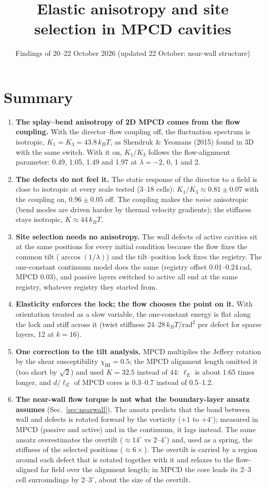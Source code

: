 \documentclass[11pt,a4paper]{article}
\title{Elastic anisotropy and site selection in MPCD cavities}
\author{Findings of 20--22 October 2026 (updated 22 October: near-wall structure)}
\date{}
\newcommand{\kT}{k_BT}\newcommand{\half}{\tfrac12}\newcommand{\la}{\ell_a}
\begin{document}
\maketitle

\section*{Summary}
\begin{enumerate}
\item \textbf{The splay--bend anisotropy of 2D MPCD comes from the flow coupling.} With the director--flow coupling off, the fluctuation spectrum
is isotropic, $K_1=K_3=43.8\,\kT$, as Shendruk \& Yeomans (2015) found in 3D with the same switch. With it on, $K_1/K_3$ follows the
flow-alignment parameter: 0.49, 1.05, 1.49 and 1.97 at $\lambda=-2$, 0, 1 and 2.
\item \textbf{The defects do not feel it.} The static response of the director to a field is close to isotropic at every scale tested (3--18
cells): $K_1/K_3\approx0.81\pm0.07$ with the coupling on, $0.96\pm0.05$ off. The coupling makes the \emph{noise} anisotropic (bend modes are
driven harder by thermal velocity gradients); the stiffness stays isotropic, $K\approx44\,\kT$.
\item \textbf{Site selection needs no anisotropy.} The wall defects of active cavities sit at the same positions for every initial condition
because the flow fixes the common tilt ($\arccos(1/\lambda)$) and the tilt--position lock fixes the registry. The one-constant continuum model does
the same (registry offset 0.01--0.24\,rad, MPCD 0.03), and passive layers switched to active all end at the same registry, whatever registry
they started from.
\item \textbf{Elasticity enforces the lock; the flow chooses the point on it.} With orientation treated as a slow variable, the one-constant energy
is flat along the lock and stiff across it (twist stiffness 24--28\,$\kT$/rad$^2$ per defect for sparse layers, 12 at $k=16$).
\item \textbf{One correction to the tilt analysis.} MPCD multiplies the Jeffery rotation by the shear susceptibility $\chi_\mathrm{HI}=0.5$; the
MPCD alignment length omitted it (too short by $\sqrt2$) and used $K=32.5$ instead of 44: $\ell_E$ is about 1.65 times longer, and $d/\ell_E$
of MPCD cores is 0.3--0.7 instead of 0.5--1.2.
\item \textbf{The near-wall flow torque is not what the boundary-layer ansatz assumes} (Sec.~\ref{sec:nearwall}). The ansatz predicts that the band
between wall and defects is rotated forward by the vorticity ($+1$ to $+4^\circ$); measured in MPCD (passive and active) and in the continuum, it
lags instead. The same ansatz overestimates the overtilt ($\approx14^\circ$ vs 2--$4^\circ$) and, used as a spring, the stiffness of the selected
positions ($\approx6\times$). The overtilt is carried by a region around each defect that is rotated together with it and relaxes to the flow-aligned
far field over the alignment length; in MPCD the core leads its 2--3 cell surroundings by 2--$3^\circ$, about the size of the overtilt.
\end{enumerate}
\end{document}
